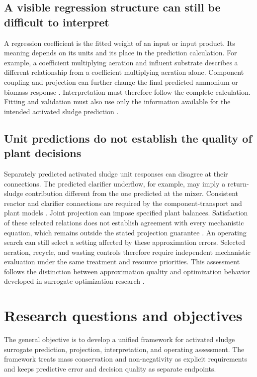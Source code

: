 \subsection{A visible regression structure can still be difficult to interpret}

A regression coefficient is the fitted weight of an input or input product. Its meaning depends on its units and its place in the prediction calculation. For example, a coefficient multiplying aeration and influent substrate describes a different relationship from a coefficient multiplying aeration alone. Component coupling and projection can further change the final predicted ammonium or biomass response \citep{Selerio2026}. Interpretation must therefore follow the complete calculation. Fitting and validation must also use only the information available for the intended activated sludge prediction \citep{Kaufman2012}.

\subsection{Unit predictions do not establish the quality of plant decisions}

Separately predicted activated sludge unit responses can disagree at their connections. The predicted clarifier underflow, for example, may imply a return-sludge contribution different from the one predicted at the mixer. Consistent reactor and clarifier connections are required by the component-transport and plant models \citep{JeppssonDiehl1996,Alex2008}. Joint projection can impose specified plant balances. Satisfaction of these selected relations does not establish agreement with every mechanistic equation, which remains outside the stated projection guarantee \citep{KircherVotsmeier2025,Selerio2026}. An operating search can still select a setting affected by these approximation errors. Selected aeration, recycle, and wasting controls therefore require independent mechanistic evaluation under the same treatment and resource priorities. This assessment follows the distinction between approximation quality and optimization behavior developed in surrogate optimization research \citep{Alexandrov1998,Pedrozo2025}.

\section{Research questions and objectives}
\label{sec:research_questions}

The general objective is to develop a unified framework for activated sludge surrogate prediction, projection, interpretation, and operating assessment. The framework treats mass conservation and non-negativity as explicit requirements and keeps predictive error and decision quality as separate endpoints.

